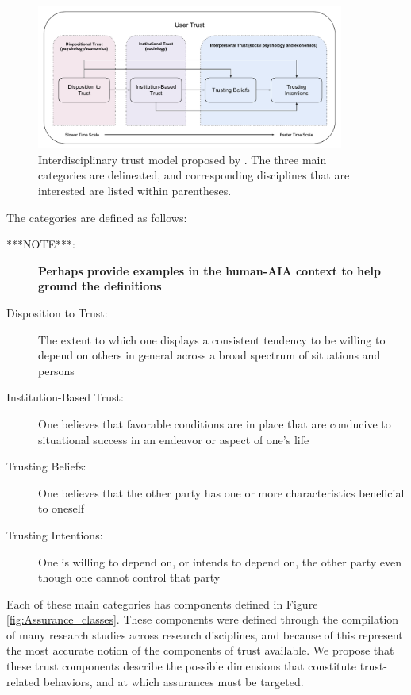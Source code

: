         \begin{figure}[htbp]
            \centering
            \includegraphics[width=0.9\textwidth]{Figures/UserTrust}
            \caption{Interdisciplinary trust model proposed by \citet{McKnight2001-fa}. The three main categories are delineated, and corresponding disciplines that are interested are listed within parentheses.}
            \label{fig:UserTrust}
        \end{figure}

        The categories are defined as follows:

        \begin{description}
            \item [***NOTE***:] \textbf{Perhaps provide examples in the human-AIA context to help ground the definitions}
            \item [Disposition to Trust:] The extent to which one displays a consistent tendency to be willing to depend on others in general across a broad spectrum of situations and persons
            \item [Institution-Based Trust:] One believes that favorable conditions are in place that are conducive to situational success in an endeavor or aspect of one's life
            \item [Trusting Beliefs:] One believes that the other party has one or more characteristics beneficial to oneself
            \item [Trusting Intentions:] One is willing to depend on, or intends to depend on, the other party even though one cannot control that party
        \end{description}

        Each of these main categories has components defined in Figure \ref{fig:Assurance_classes}. These components were defined through the compilation of many research studies across research disciplines, and because of this represent the most accurate notion of the components of trust available. We propose that these trust components describe the possible dimensions that constitute trust-related behaviors, and at which assurances must be targeted.

